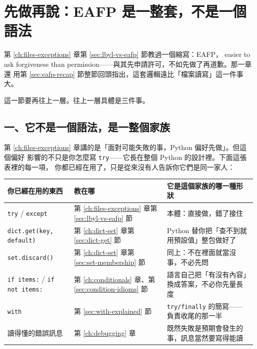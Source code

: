 \section{先做再說：EAFP 是一整套，不是一個語法}
\label{sec:eafp-closure}

第 \ref{ch:files-exceptions} 章第 \ref{sec:lbyl-vs-eafp} 節教過一個縮寫：EAFP，
easier to ask forgiveness than permission——與其先申請許可，不如先做了再道歉。那一章還
用第 \ref{sec:eafp-recap} 節整節回頭指出，這套邏輯遠比「檔案讀寫」這一件事大。

這一節要再往上一層。往上一層具體是三件事。

\subsection*{一、它不是一個語法，是一整個家族}

第 \ref{ch:files-exceptions} 章講的是「面對可能失敗的事，Python 偏好先做」。但這個偏好
影響的不只是你怎麼寫 \texttt{try}——它長在整個 Python 的設計裡。下面這張表裡的每一項，
你都已經在用了，只是從來沒有人告訴你它們是同一家人：

\begin{center}
\begin{tabular}{@{}p{3.6cm}p{3.6cm}p{7.2cm}@{}}
\toprule
你已經在用的東西 & 教在哪 & 它是這個家族的哪一種形狀 \\
\midrule
\texttt{try} / \texttt{except} &
第 \ref{ch:files-exceptions} 章第 \ref{sec:lbyl-vs-eafp} 節 &
本體：直接做，錯了接住 \\
\addlinespace
\texttt{dict.get(key, default)} &
第 \ref{ch:dict-set} 章第 \ref{sec:dict-get} 節 &
Python 替你把「查不到就用預設值」整包做好了 \\
\addlinespace
\texttt{set.discard()} &
第 \ref{ch:dict-set} 章第 \ref{sec:set-membership} 節 &
同上：不在裡面就當沒事，不必先問 \\
\addlinespace
\texttt{if items:} / \texttt{if not items:} &
第 \ref{ch:conditionals} 章、第 \ref{sec:condition-idioms} 節 &
語言自己把「有沒有內容」換成答案，不必你先量長度 \\
\addlinespace
\texttt{with} &
第 \ref{sec:with-explained} 節 &
\texttt{try/finally} 的簡寫——負責收尾的那一半 \\
\addlinespace
讀得懂的錯誤訊息 &
第 \ref{ch:debugging} 章 &
既然失敗是預期會發生的事，訊息當然要寫得能讀 \\
\bottomrule
\end{tabular}
\end{center}

